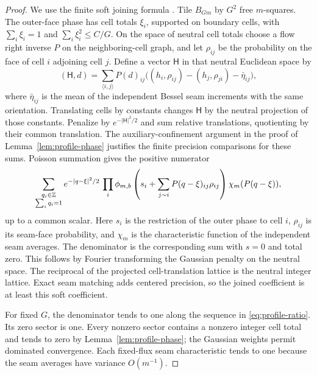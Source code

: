 \begin{proof}
We use the finite soft joining formula
\cite[Equation~(2.11)]{X}. Tile $B_{Gm}$ by $G^2$ free
$m$-squares. The outer-face phase has cell totals $\xi_i$, supported
on boundary cells, with $\sum_i\xi_i=1$ and
$\sum_i\xi_i^2\le C/G$. On the space of neutral cell totals choose a
flow right inverse $P$ on the neighboring-cell graph, and let
$\rho_{ij}$ be the probability on the face of cell $i$ adjoining
cell $j$. Define a vector
$\mathsf H$ in that neutral Euclidean space by
\[
 (\mathsf H,d)=\sum_{\langle i,j\rangle}P(d)_{ij}
       \bigl((h_i,\rho_{ij})-(h_j,\rho_{ji})
                         -\bar\eta_{ij}\bigr),
\]
where $\bar\eta_{ij}$ is the mean of the independent Bessel seam
increments with the same orientation. Translating cells by constants
changes $\mathsf H$ by the neutral projection of those constants. Penalize by
$e^{-|\mathsf H|^2/2}$ and sum relative translations, quotienting by their
common translation. The auxiliary-confinement argument in the proof
of Lemma~\ref{lem:profile-phase} justifies the finite precision
comparisons for these sums.
Poisson summation gives the positive numerator
\begin{equation}\label{eq:profile-soft-sum}
 \sum_{\substack{q_i\in\mathbb Z\\\sum_iq_i=1}}
 e^{-|q-\xi|^2/2}\,
 \prod_i\phi_{m,b}\left(s_i+
              \sum_{j\sim i}P(q-\xi)_{ij}\rho_{ij}\right)
 \chi_m(P(q-\xi)),
\end{equation}
up to a common scalar. Here $s_i$ is the restriction of the outer
phase to cell $i$, $\rho_{ij}$ is its seam-face probability, and
$\chi_m$ is the characteristic function of the independent seam
averages. The denominator is the corresponding sum with $s=0$ and
total zero. This follows by Fourier transforming the Gaussian penalty
on the neutral space. The reciprocal of the projected cell-translation
lattice is the neutral integer lattice. Exact seam matching adds centered precision, so the joined
coefficient is at least this soft coefficient.

For fixed $G$, the denominator tends to one along the sequence in
\eqref{eq:profile-ratio}. Its zero sector is one. Every nonzero
sector contains a nonzero integer cell total and tends to zero by
Lemma~\ref{lem:profile-phase}; the Gaussian weights permit dominated
convergence. Each fixed-flux seam characteristic tends to one because
the seam averages have variance $O(m^{-1})$.


\end{proof}
